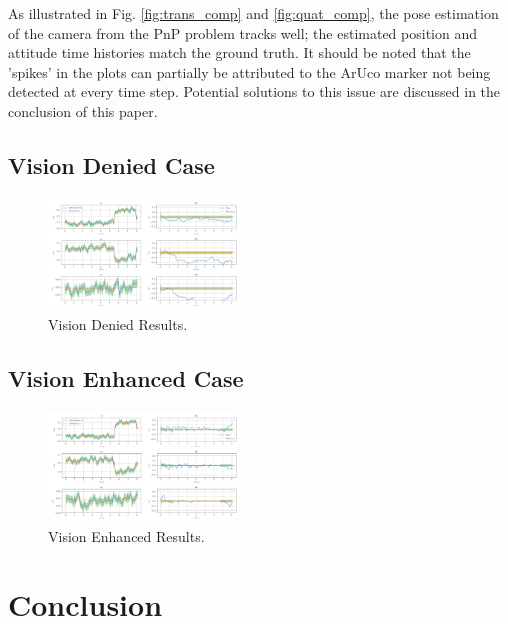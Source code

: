 \documentclass[conference]{IEEEtran}
\begin{document}
As illustrated in Fig. \ref{fig:trans_comp} and \ref{fig:quat_comp}, the pose estimation of the camera from the PnP problem tracks well; the estimated position and attitude time histories match the ground truth. 
It should be noted that the 'spikes' in the plots can partially be attributed to the ArUco marker not being detected at every time step.
Potential solutions to this issue are discussed in the conclusion of this paper.


\subsection{Vision Denied Case}

\begin{figure}[ht!] 
    \centerline{\includegraphics[width=0.45\textwidth]{vision_denied_case.png}}
    \caption{Vision Denied Results.}
    \label{fig:results_novision}
\end{figure}

\subsection{Vision Enhanced Case}

\begin{figure}[ht!] 
    \centerline{\includegraphics[width=0.45\textwidth]{vision_enhanced_case.png}}
    \caption{Vision Enhanced Results.}
    \label{fig:results_withvision}
\end{figure}



\section{Conclusion}
\end{document}
